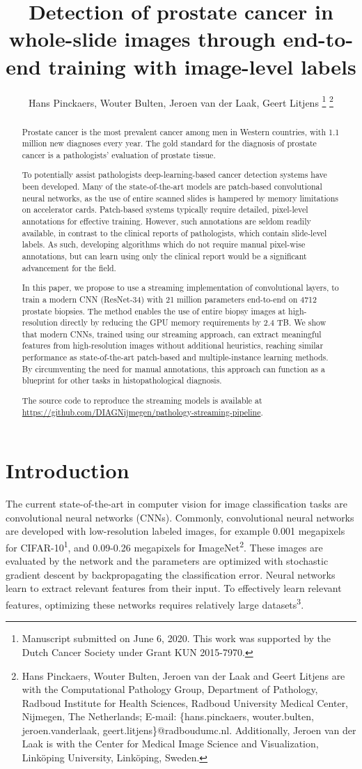 \documentclass[
  12pt,
  a5,margin=2cmpaper,
]{article}
\title{Detection of prostate cancer in whole-slide images through
end-to-end training with image-level labels}
\author{Hans Pinckaers, Wouter Bulten, Jeroen van der Laak, Geert
Litjens \footnote{Manuscript submitted on June 6, 2020. This work was
  supported by the Dutch Cancer Society under Grant KUN 2015-7970.}
\footnote{Hans Pinckaers, Wouter Bulten, Jeroen van der Laak and Geert
  Litjens are with the Computational Pathology Group, Department of
  Pathology, Radboud Institute for Health Sciences, Radboud University
  Medical Center, Nijmegen, The Netherlands; E-mail: \{hans.pinckaers,
  wouter.bulten, jeroen.vanderlaak, geert.litjens\}@radboudumc.nl.
  Additionally, Jeroen van der Laak is with the Center for Medical Image
  Science and Visualization, Linköping University, Linköping, Sweden.}}
\date{}
\begin{document}
\maketitle
\begin{abstract}
Prostate cancer is the most prevalent cancer among men in Western
countries, with 1.1 million new diagnoses every year. The gold standard
for the diagnosis of prostate cancer is a pathologists' evaluation of
prostate tissue.

To potentially assist pathologists deep-learning-based cancer detection
systems have been developed. Many of the state-of-the-art models are
patch-based convolutional neural networks, as the use of entire scanned
slides is hampered by memory limitations on accelerator cards.
Patch-based systems typically require detailed, pixel-level annotations
for effective training. However, such annotations are seldom readily
available, in contrast to the clinical reports of pathologists, which
contain slide-level labels. As such, developing algorithms which do not
require manual pixel-wise annotations, but can learn using only the
clinical report would be a significant advancement for the field.

In this paper, we propose to use a streaming implementation of
convolutional layers, to train a modern CNN (ResNet-34) with 21 million
parameters end-to-end on 4712 prostate biopsies. The method enables the
use of entire biopsy images at high-resolution directly by reducing the
GPU memory requirements by 2.4 TB. We show that modern CNNs, trained
using our streaming approach, can extract meaningful features from
high-resolution images without additional heuristics, reaching similar
performance as state-of-the-art patch-based and multiple-instance
learning methods. By circumventing the need for manual annotations, this
approach can function as a blueprint for other tasks in
histopathological diagnosis.

The source code to reproduce the streaming models is available at
\url{https://github.com/DIAGNijmegen/pathology-streaming-pipeline}.
\end{abstract}

\hypertarget{introduction}{%
\section{Introduction}\label{introduction}}

The current state-of-the-art in computer vision for image classification
tasks are convolutional neural networks (CNNs). Commonly, convolutional
neural networks are developed with low-resolution labeled images, for
example 0.001 megapixels for CIFAR-10\textsuperscript{1}, and 0.09-0.26
megapixels for ImageNet\textsuperscript{2}. These images are evaluated
by the network and the parameters are optimized with stochastic gradient
descent by backpropagating the classification error. Neural networks
learn to extract relevant features from their input. To effectively
learn relevant features, optimizing these networks requires relatively
large datasets\textsuperscript{3}.
\end{document}
